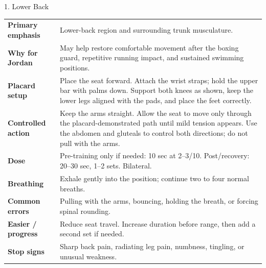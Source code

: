 \documentclass[10pt,letterpaper]{article}
\begin{document}
\begin{stretchbox}{1. Lower Back}
\begin{tabularx}{\textwidth}{@{}L{1.28in}Y@{}}
\textbf{Primary emphasis} & Lower-back region and surrounding trunk musculature. \\
\textbf{Why for Jordan} & May help restore comfortable movement after the boxing guard, repetitive running impact, and sustained swimming positions. \\
\textbf{Placard setup} & Place the seat forward. Attach the wrist straps; hold the upper bar with palms down. Support both knees as shown, keep the lower legs aligned with the pads, and place the feet correctly. \\
\textbf{Controlled action} & Keep the arms straight. Allow the seat to move only through the placard-demonstrated path until mild tension appears. Use the abdomen and gluteals to control both directions; do not pull with the arms. \\
\textbf{Dose} & Pre-training only if needed: 10 sec at 2--3/10. Post/recovery: 20--30 sec, 1--2 sets. Bilateral. \\
\textbf{Breathing} & Exhale gently into the position; continue two to four normal breaths. \\
\textbf{Common errors} & Pulling with the arms, bouncing, holding the breath, or forcing spinal rounding. \\
\textbf{Easier / progress} & Reduce seat travel. Increase duration before range, then add a second set if needed. \\
\textbf{Stop signs} & Sharp back pain, radiating leg pain, numbness, tingling, or unusual weakness. \\
\end{tabularx}
\end{stretchbox}
\end{document}
